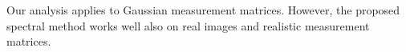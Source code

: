 \documentclass[final,12pt]{colt2018}
\def\bx{{\boldsymbol x}}
\begin{document}




Our analysis applies to Gaussian measurement matrices. However, the proposed spectral method works well also on real images and realistic
measurement matrices. %
\end{document}
